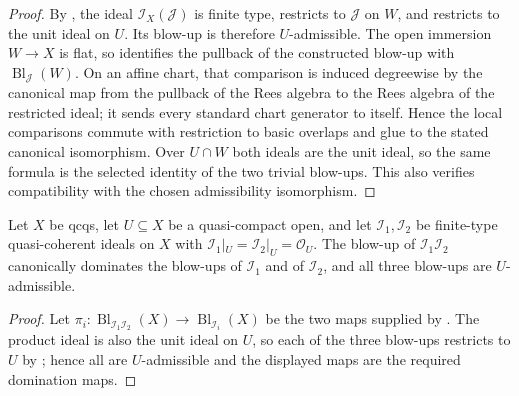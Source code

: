 \begin{proof}
  \leanok
  By , the ideal
  $\mathcal I_X(\mathcal J)$ is finite type, restricts to $\mathcal J$ on
  $W$, and restricts to the unit ideal on $U$.  Its blow-up is therefore
  $U$-admissible.  The open immersion $W\to X$ is flat, so
   identifies the pullback of the
  constructed blow-up with $\operatorname{Bl}_{\mathcal J}(W)$.  On an
  affine chart, that comparison is induced degreewise by the canonical map
  from the pullback of the Rees algebra to the Rees algebra of the restricted
  ideal; it sends every standard chart generator to itself.  Hence the local
  comparisons commute with restriction to basic overlaps and glue to the
  stated canonical isomorphism.  Over $U\cap W$ both ideals are the unit
  ideal, so the same formula is the selected identity of the two trivial
  blow-ups.  This also verifies compatibility with the chosen admissibility
  isomorphism.
\end{proof}

\begin{lemma}
  \label{lemma:nagata-product-ideal-common-blowup}
  \leanok

  Let $X$ be qcqs, let $U\subseteq X$ be a quasi-compact open, and let
  $\mathcal I_1,\mathcal I_2$ be finite-type quasi-coherent ideals on $X$ with
  $\mathcal I_1|_U=\mathcal I_2|_U=\mathcal O_U$.  The blow-up of
  $\mathcal I_1\mathcal I_2$ canonically dominates the blow-ups of
  $\mathcal I_1$ and of $\mathcal I_2$, and all three blow-ups are
  $U$-admissible.
\end{lemma}

\begin{proof}
  \leanok
  Let $\pi_i\colon\operatorname{Bl}_{\mathcal I_1\mathcal I_2}(X)
  \to\operatorname{Bl}_{\mathcal I_i}(X)$ be the two maps supplied by
  .  The product ideal is
  also the unit ideal on $U$, so each of the three blow-ups restricts to $U$
  by ; hence all are
  $U$-admissible and the displayed maps are the required domination maps.
\end{proof}

